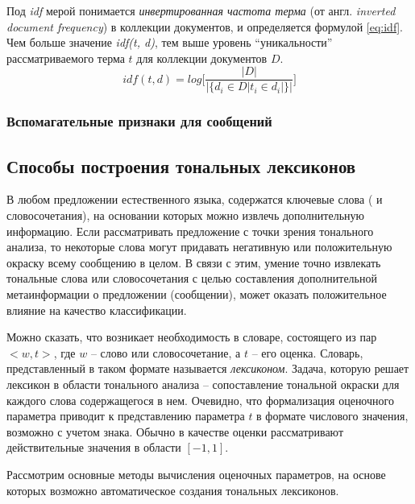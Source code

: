         Под {\it idf } мерой понимается {\it инвертированная частота терма} (от англ.
        {\it inverted document frequency}) в коллекции документов, и определяется
        формулой \ref{eq:idf}. Чем больше значение {\it idf(t, d)}, тем выше уровень
        ``уникальности'' рассматриваемого терма $t$ для коллекции документов $D$.
        \begin{equation}
            \label{eq:idf}
            idf(t, d) = log \Bigg[ \dfrac{|D|}{|\{d_i \in D | t_i \in d_i|\}|} \Bigg]
        \end{equation}

        \subsubsection{Вспомагательные признаки для сообщений}

    \subsection{Способы построения тональных лексиконов}

    В любом предложении естественного языка, содержатся ключевые слова ( и словосочетания),
    на основании которых можно извлечь дополнительную информацию. Если рассматривать
    предложение с точки зрения тонального анализа, то некоторые слова могут
    придавать негативную или положительную окраску всему сообщению в целом.
    В связи с этим, умение точно извлекать тональные слова или словосочетания
    с целью составления дополнительной метаинформации о предложении (сообщении),
    может оказать положительное влияние на качество классификации.

    Можно сказать, что возникает необходимость в словаре, состоящего из пар
    $<w, t>$, где $w$ -- слово или словосочетание, а $t$ -- его оценка.
    Словарь, представленный в таком формате называется {\it лексиконом}.
    Задача, которую решает лексикон в области тонального анализа -- сопоставление
    тональной окраски для каждого слова содержащегося в нем.
    Очевидно, что формализация оценочного параметра приводит к представлению
    параметра $t$ в формате числового значения, возможно с учетом знака.
    Обычно в качестве оценки рассматривают действительные значения в области
    $\left[ -1, 1\right]$.

    Рассмотрим основные методы вычисления оценочных параметров, на основе которых
    возможно автоматическое создания тональных лексиконов.

